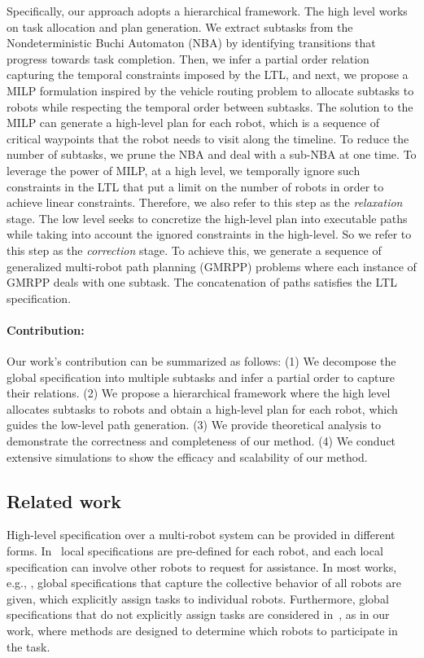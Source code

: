 \documentclass[Afour,sageh,times]{sagej}
\begin{document}
Specifically, our approach adopts a hierarchical framework. The high level works on task allocation and plan generation. We extract subtasks from the Nondeterministic Buchi Automaton (NBA) by identifying transitions that progress towards task completion. Then, we infer a partial order relation capturing the temporal constraints imposed by the LTL, and next, we propose a MILP formulation inspired by the vehicle routing problem to allocate subtasks to robots while respecting the temporal order between subtasks. The solution to the MILP can generate a high-level plan for each robot, which is a sequence of critical waypoints that the robot needs to visit along the timeline. To reduce the number of subtasks, we prune the NBA and deal with a sub-NBA at one time.  To leverage the power of MILP, at a high level, we temporally ignore such constraints in the LTL that put a limit on the number of robots in order to achieve linear constraints. Therefore, we also refer to this step as the {\it relaxation} stage. The low level seeks to concretize the high-level plan into executable paths while taking into account the ignored constraints in the high-level. So we refer to this step as the {\it correction} stage. To achieve this, we generate a sequence of generalized multi-robot path planning (GMRPP) problems where each instance of GMRPP deals with one subtask. The concatenation of paths satisfies the LTL specification.


\paragraph{Contribution:} Our work's contribution can be summarized as follows: (1) We decompose the global specification into multiple subtasks and infer a partial order to capture their relations.  (2) We propose a hierarchical framework where the high level allocates subtasks to robots and obtain a high-level plan for each robot, which guides the low-level path generation. (3) We provide theoretical analysis to demonstrate the correctness and completeness of our method. (4) We conduct extensive simulations to show the efficacy and scalability of our method.


\subsection{Related work}
High-level specification over a multi-robot system can be provided in different forms. In~\cite{guo2015multi,tumova2016multi} local specifications are pre-defined for each robot, and each local specification can involve other robots to request for assistance. In most works, e.g., \cite{loizou2004automatic,smith2011optimal,saha2014automated,kantaros2015intermittent,kantaros2017sampling,kantaros2018sampling,kantaros2018text,kantaros2018temporal,kantaros2018distributedOpt,xluo_CDC19,luo2019abstraction}, global specifications that capture the collective behavior of all robots are given, which explicitly assign tasks to individual robots. Furthermore, global specifications that do not explicitly assign tasks are considered in~\cite{kloetzer2011multi,shoukry2017linear,moarref2017decentralized,lacerda2019petri}, as in our work, where methods are designed to determine which robots to participate in the task.
\end{document}
